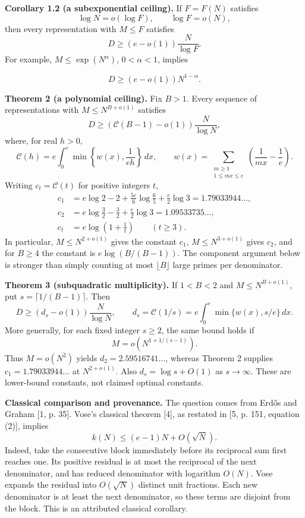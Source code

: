 \documentclass[11pt]{article}
\begin{document}
\textbf{Corollary 1.2 (a subexponential ceiling).} If \(F=F(N)\) satisfies
\[
\log N=o(\log F),\qquad \log F=o(N),
\]
then every representation with \(M\le F\) satisfies
\[
D\ge(e-o(1))\frac{N}{\log F}. \tag{5}
\]
For example, \(M\le\exp(N^\alpha)\), \(0<\alpha<1\), implies

\[
D\ge(e-o(1))N^{1-\alpha}.
\]

\textbf{Theorem 2 (a polynomial ceiling).} Fix \(B>1\). Every sequence of representations with \(M\le N^{B+o(1)}\) satisfies
\[
D\ge(\mathcal C(B-1)-o(1))\frac{N}{\log N}, \tag{6}
\]
where, for real \(h>0\),
\[
\mathcal C(h)=e\int_0^e\min\left\{w(x),\frac1{eh}\right\}\,dx,
\qquad
w(x)=\sum_{\substack{m\ge1\\1\le mx\le e}}
\left(\frac1{mx}-\frac1e\right).
\]
Writing \(c_t=\mathcal C(t)\) for positive integers \(t\),
\[
\begin{aligned}
c_1&=e\log2-2+\frac{5e}{6}\log\frac65+\frac e2\log3
       =1.79033944\ldots,\\
c_2&=e\log\frac32-\frac32+\frac e2\log3
       =1.09533735\ldots,\\
c_t&=e\log\left(1+\frac1t\right)\qquad(t\ge3).
\end{aligned} \tag{7}
\]
In particular, \(M\le N^{2+o(1)}\) gives the constant \(c_1\), \(M\le N^{3+o(1)}\) gives \(c_2\), and for \(B\ge4\) the constant is \(e\log(B/(B-1))\). The component argument below is stronger than simply counting at most \(\lfloor B\rfloor\) large primes per denominator.

\textbf{Theorem 3 (subquadratic multiplicity).} If \(1<B<2\) and \(M\le N^{B+o(1)}\), put \(s=\lceil1/(B-1)\rceil\). Then
\[
D\ge(d_s-o(1))\frac N{\log N},\qquad
d_s=\mathcal C(1/s)
=e\int_0^e\min\{w(x),s/e\}\,dx. \tag{7a}
\]
More generally, for each fixed integer \(s\ge2\), the same bound holds if
\[
M=o\!\left(N^{1+1/(s-1)}\right). \tag{7b}
\]
Thus \(M=o(N^2)\) yields \(d_2=2.59516741\ldots\), whereas Theorem 2 supplies \(c_1=1.79033944\ldots\) at \(N^{2+o(1)}\). Also \(d_s=\log s+O(1)\) as \(s\to\infty\). These are lower-bound constants, not claimed optimal constants.

\textbf{Classical comparison and provenance.} The question comes from Erd\H{o}s and Graham [1, p. 35]. Vose's classical theorem [4], as restated in [5, p. 151, equation (2)], implies
\[
k(N)\le(e-1)N+O(\sqrt N).
\]
Indeed, take the consecutive block immediately before its reciprocal sum first reaches one. Its positive residual is at most the reciprocal of the next denominator, and has reduced denominator with logarithm \(O(N)\). Vose expands the residual into \(O(\sqrt N)\) distinct unit fractions. Each new denominator is at least the next denominator, so these terms are disjoint from the block. This is an attributed classical corollary.
\end{document}
